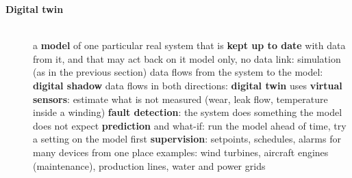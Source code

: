 \begin{description}
\item[{\rot\bf Digital twin}]~\\[-\lblskip]
\bi
	\ite a \textbf{model} of one particular real system that is \textbf{kept up to date} with data from it, and that may act back on it
	\bi
		\ite model only, no data link: simulation (as in the previous section)
		\ite data flows from the system to the model: \textbf{digital shadow}
		\ite data flows in both directions: \textbf{digital twin}
	\ei
	\ite uses
	\bi
		\ite \textbf{virtual sensors}: estimate what is not measured (wear, leak flow, temperature inside a winding)
		\ite \textbf{fault detection}: the system does something the model does not expect
		\ite \textbf{prediction} and what-if: run the model ahead of time, try a setting on the model first
		\ite \textbf{supervision}: setpoints, schedules, alarms for many devices from one place
	\ei
	\ite examples: wind turbines, aircraft engines (maintenance), production lines, water and power grids
\ei
\os{\newpage}


\end{description}
